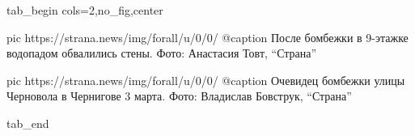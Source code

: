  
 
 
 
 


\ifcmt
  tab_begin cols=2,no_fig,center

     pic https://strana.news/img/forall/u/0/0/%
		 @caption После бомбежки в 9-этажке водопадом обвалились стены. Фото: Анастасия Товт, \enquote{Страна}

		 pic https://strana.news/img/forall/u/0/0/%
		 @caption Очевидец бомбежки улицы Черновола в Чернигове 3 марта. Фото: Владислав Бовструк, \enquote{Страна}

  tab_end
\fi
